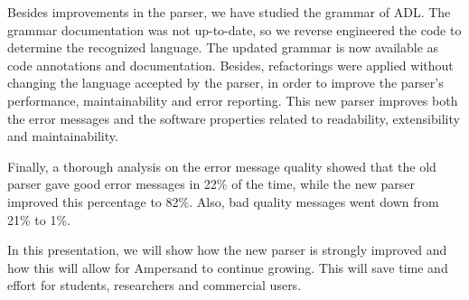 Besides improvements in the parser, we have studied the grammar of ADL.
The grammar documentation was not up-to-date, so we reverse engineered the code to determine the recognized language.
The updated grammar is now available as code annotations and documentation.
Besides, refactorings were applied without changing the language accepted by the parser, in order to improve the parser's performance, maintainability and error reporting.
This new parser improves both the error messages and the software properties related to readability, extensibility and maintainability.

Finally, a thorough analysis on the error message quality showed that the old parser gave good error messages in 22\% of the time, while the new parser improved this percentage to 82\%.
Also, bad quality messages went down from 21\% to 1\%.

In this presentation, we will show how the new parser is strongly improved and how this will allow for Ampersand to continue growing.
This will save time and effort for students, researchers and commercial users.
